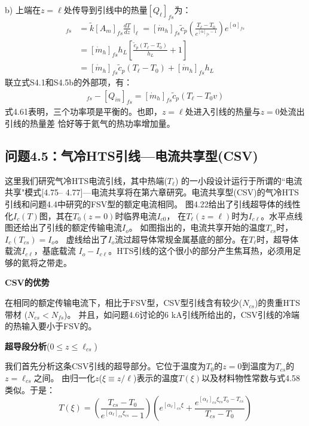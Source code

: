 b) 上端在$z=\ell$处传导到引线中的热量$[Q_{\ell}]_{fs}$为：
\begin{align*}
[Q_\ell]_{fs}&=\tilde{k}[A_m]_{fs}\frac{dT}{dz}\mid_\ell=[\dot{m}_h]_{fs}\tilde{c}_p(\frac{T_\ell-T_0}{e^{[\alpha]_{fs}-1}})e^{[\alpha]_{fs}}\\ \tag{S4.5a}
&=[\dot{m}_h]_{fs}h_L\left[\frac{\tilde{c}_p(T_\ell-T_0)}{h_L}+1\right]\\
&=[\dot{m}_h]_{fs}\tilde{c}_p(T_\ell-T_0)+[\dot{m}_h]_{fs}h_L\tag{S4.5b}
\end{align*}
联立式S4.1和S4.5b的外部项，有：
\begin{align*}%
[Q_\ell]_{fs}-[Q_{in}]_{fs}=[\dot{m}_h]_{fs}\tilde{c}_p(T_\ell-T_0v)\tag{4.61}
\end{align*}
式4.61表明，三个功率项是平衡的。也即，$z=\ell$处进入引线的热量与$z=0$处流出引线的热量差
恰好等于氦气的热功率增加量。

\subsection{问题4.5：气冷HTS引线---电流共享型(CSV)}

这里我们研究气冷HTS电流引线，其中热端($T_\ell$) 的一小段设计运行于所谓的``电流共享"模式[4.75–
4.77]---电流共享将在第六章研究。电流共享型(CSV)的气冷HTS引线和问题4.4中研究的FSV型的额定电流相同。
图4.22给出了引线超导体的线性化$I_c(T)$图，其在$T_0 (z = 0)$时临界电流$I_{c0}$，
在$T_\ell(z=\ell)$时为$I_{c\ell}$。水平点线图还给出了引线的额定传输电流$I_o$。
如图指出的，电流共享开始的温度$T_{cs}$时，$I_c(T_{cs})=I_o$。
虚线给出了$I_o$流过超导体常规金属基底的部分。在$T_\ell$时，超导体载流$I_{c\ell}$，基底载流
$I_o-I_{c\ell}$。HTS引线的这个很小的部分产生焦耳热，必须用足够的氦将之带走。

\textbf{CSV的优势}

在相同的额定传输电流下，相比于FSV型，CSV型引线含有较少($N_{cs}$)的贵重HTS带材 ($N_{cs} <N_{fs}$)。
并且，如问题4.6讨论的6 kA引线所给出的，CSV引线的冷端的热输入要小于FSV的。

\textbf{超导段分析}($0\le z\le \ell_{cs}$)

我们首先分析这条CSV引线的超导部分。它位于温度为$T_0$的$z = 0$到温度为$T_{cs}$的$z =\ell_{cs}$之间。
由归一化$z$($\xi\equiv z/\ell$)表示的温度$T(\xi)$以及材料物性常数与式4.58类似。于是：
\begin{equation}%
T(\xi)=\left(\frac{T_{cs}-T_0}{e^{[\alpha_\ell]_{cs}\xi_{cs}}-1}\right)\left(e^{[\alpha_\ell]_{cs}\xi}+\frac{e^{[\alpha_\ell]_{cs}\xi_{cs}T_0-T_{cs}}}{T_{cs}-T_0}\right)
\end{equation}

